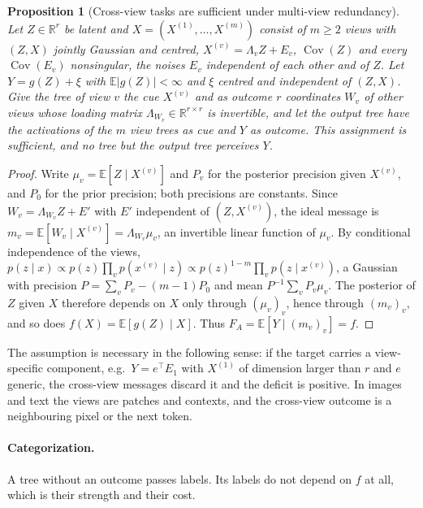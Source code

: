 \documentclass[11pt]{article}
\newtheorem{proposition}[theorem]{Proposition}
\theoremstyle{definition}
\theoremstyle{remark}
\newcommand{\R}{\mathbb{R}}
\newcommand{\E}{\mathbb{E}}
\begin{document}
\begin{proposition}[Cross-view tasks are sufficient under multi-view redundancy]\label{prop:multiview}
Let $Z\in\R^r$ be latent and $X=(X^{(1)},\dots,X^{(m)})$ consist of $m\ge2$ views with
$(Z,X)$ jointly Gaussian and centred, $X^{(v)}=\Lambda_vZ+E_v$, $\operatorname{Cov}(Z)$ and
every $\operatorname{Cov}(E_v)$ nonsingular, the noises $E_v$ independent of each other and
of $Z$.  Let $Y=g(Z)+\xi$ with $\E|g(Z)|<\infty$ and $\xi$
centred and independent of $(Z,X)$.  Give the tree of view $v$ the cue $X^{(v)}$ and as
outcome $r$ coordinates $W_v$ of other views whose loading matrix $\Lambda_{W_v}\in\R^{r\times r}$
is invertible, and let the output tree have the activations of the $m$ view trees as cue
and $Y$ as outcome.  This assignment is sufficient, and no tree but the output tree
perceives $Y$.
\end{proposition}
\begin{proof}
Write $\mu_v=\E[Z\mid X^{(v)}]$ and $P_v$ for the posterior precision given $X^{(v)}$, and
$P_0$ for the prior precision; both precisions are constants.  Since $W_v=\Lambda_{W_v}Z+E'$
with $E'$ independent of $(Z,X^{(v)})$, the ideal message is
$m_v=\E[W_v\mid X^{(v)}]=\Lambda_{W_v}\mu_v$, an invertible linear function of $\mu_v$.
By conditional independence of the views,
$p(z\mid x)\propto p(z)\prod_vp(x^{(v)}\mid z)\propto p(z)^{1-m}\prod_vp(z\mid x^{(v)})$,
a Gaussian with precision $P=\sum_vP_v-(m-1)P_0$ and mean $P^{-1}\sum_vP_v\mu_v$.  The
posterior of $Z$ given $X$ therefore depends on $X$ only through $(\mu_v)_v$, hence through
$(m_v)_v$, and so does $f(X)=\E[g(Z)\mid X]$.  Thus $F_A=\E[Y\mid(m_v)_v]=f$.
\end{proof}

The assumption is necessary in the following sense: if the target carries a
view-specific component, e.g.\ $Y=e^\top E_1$ with $X^{(1)}$ of dimension larger than
$r$ and $e$ generic, the cross-view messages discard it and the deficit is positive.  In images and text the
views are patches and contexts, and the cross-view outcome is a neighbouring pixel or
the next token.

\paragraph{Categorization.}
A tree without an outcome passes labels.  Its labels do not depend on $f$ at all, which
is their strength and their cost.
\end{document}
